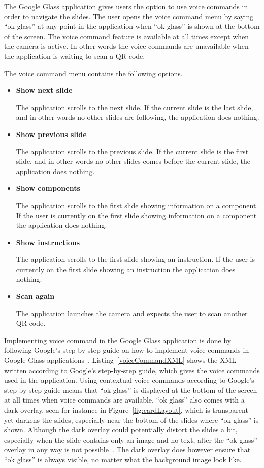 The Google Glass application gives users the option to use voice commands in order to navigate the slides. The user opens the voice command menu by saying ``ok glass'' at any point in the application when ``ok glass'' is shown at the bottom of the screen. The voice command feature is available at all times except when the camera is active. In other words the voice commands are unavailable when the application is waiting to scan a QR code.

The voice command menu contains the following options.

\begin{itemize}
	\item \textbf{Show next slide}
	
	The application scrolls to the next slide. If the current slide is the last slide, and in other words no other slides are following, the application does nothing.
	\item \textbf{Show previous slide}
	
	The application scrolls to the previous slide. If the current slide is the first slide, and in other words no other slides comes before the current slide, the application does nothing.
	\item \textbf{Show components}
	
	The application scrolls to the first slide showing information on a component. If the user is currently on the first slide showing information on a component the application does nothing. 
	\item \textbf{Show instructions}
	
	The application scrolls to the first slide showing an instruction. If the user is currently on the first slide showing an instruction the application does nothing.
	\item \textbf{Scan again}
	
	The application launches the camera and expects the user to scan another QR code.
\end{itemize}

Implementing voice command in the Google Glass application is done by following Google's step-by-step guide on how to implement voice commands in Google Glass applications~\cite{howToVoiceInput}. Listing~\ref{voiceCommandXML} shows the XML written according to Google's step-by-step guide, which gives the voice commands used in the application. Using contextual voice commands according to Google's step-by-step guide means that ``ok glass'' is displayed at the bottom of the screen at all times when voice commands are available. ``ok glass'' also comes with a dark overlay, seen for instance in Figure~\ref{fig:cardLayout}, which is transparent yet darkens the slides, especially near the bottom of the slides where ``ok glass'' is shown. Although the dark overlay could potentially distort the slides a bit, especially when the slide contains only an image and no text, alter the ``ok glass'' overlay in any way is not possible~\cite{voiceCommandCustom1, voiceCommandCustom2}. The dark overlay does however ensure that ``ok glass'' is always visible, no matter what the background image look like.


